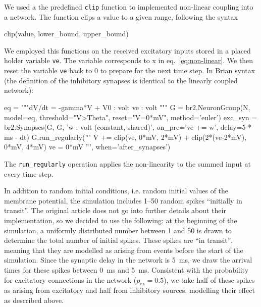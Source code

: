 \documentclass[10pt,a4paper,onecolumn]{article}
\begin{document}
We used a the predefined \verb|clip| function to implemented non-linear coupling into a network. The function clips a value to a given range, following the syntax
\begin{code}
clip(value, lower_bound, upper_bound)
\end{code}

We employed this functions on the received excitatory inputs stored in a placed holder variable \verb|ve|. The variable corresponds to x in eq.~\ref{eq:non-linear}. We then reset the variable \verb|ve| back to 0 to prepare for the next time step. In Brian syntax (the definition of the inhibitory synapses is identical to the linearly coupled network):


\begin{code}
eq = """dV/dt = -gamma*V + V0 : volt
        ve : volt
     """
G = br2.NeuronGroup(N, model=eq, threshold="V>Theta",
                    reset="V=0*mV", method='euler')
exc_syn = br2.Synapses(G, G, 'w : volt (constant, shared)',
                       on_pre='ve += w', delay=5 * ms - dt)
G.run_regularly('''
                V += clip(ve, 0*mV, 2*mV) + clip(2*(ve-2*mV), 0*mV, 4*mV)
                ve = 0*mV
                ''', when='after_synapses')
\end{code}

The \verb|run_regularly| operation applies the non-linearity to the summed input at every time step.

In addition to random initial conditions, i.e. random initial values of the membrane potential, the simulation includes 1--50 random spikes ``initially in transit''. The original article does not go into further details about their implementation, so we decided to use the following: at the beginning of the simulation, a uniformly distributed number between 1 and 50 is drawn to determine the total number of initial spikes. These spikes are ``in transit'', meaning that they are modelled as arising from events before the start of the simulation. Since the synaptic delay in the network is \SI{5}{\milli\second}, we draw the arrival times for these spikes between \SI{0}{\milli\second} and \SI{5}{\milli\second}. Consistent with the probability for excitatory connections in the network ($p_\text{ex}=0.5$), we take half of these spikes as arising from excitatory and half from inhibitory sources, modelling their effect as described above.
\end{document}

